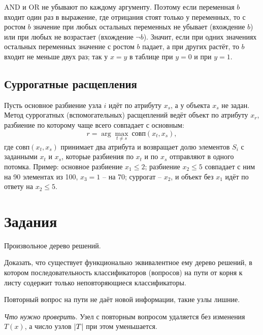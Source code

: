 \documentclass[12pt,a4paper]{article}
\begin{document}
AND и OR не убывают по каждому аргументу. Поэтому если переменная $b$ входит один раз
в выражение, где отрицания стоят только у переменных, то с ростом $b$ значение при
любых остальных переменных не убывает (вхождение $b$) или при любых не возрастает
(вхождение $\neg b$).
Значит, если при одних значениях остальных переменных значение с ростом $b$ падает, а
при других растёт, то $b$ входит не меньше двух раз; так у $x = y$ в таблице при
$y = 0$ и при $y = 1$.

\subsection{Суррогатные расщепления}

Пусть основное разбиение узла $i$ идёт по атрибуту $x_s$, а у объекта $x_s$ не задан.
Метод суррогатных (вспомогательных) расщеплений ведёт объект по атрибуту $x_r$,
разбиение по которому чаще всего совпадает с основным:
\[
  r = \arg\max_{t \ne s}\ \text{совп}(x_t, x_s),
\]
где $\text{совп}(x_t, x_s)$ принимает два атрибута и возвращает долю элементов $S_i$ с
заданными $x_t$ и $x_s$, которые разбиения по $x_t$ и по $x_s$ отправляют в одного
потомка. Пример: основное разбиение $x_1 \le 2$; разбиение $x_2 \le 5$ совпадает с ним
на 90 элементах из 100, $x_3 = 1$ -- на 70; суррогат -- $x_2$, и объект без $x_1$ идёт
по ответу на $x_2 \le 5$.

\section{Задания}

\dano Произвольное дерево решений.

\treb Доказать, что существует функционально эквивалентное ему дерево решений, в
котором последовательность классификаторов (вопросов) на пути от корня к листу
содержит только неповторяющиеся классификаторы.

\zachem Повторный вопрос на пути не даёт новой информации, такие узлы лишние.

\resh \emph{Что нужно проверить.} Узел с повторным вопросом удаляется без изменения
$T(x)$, а число узлов $\left\lvert T \right\rvert$ при этом уменьшается.
\end{document}
